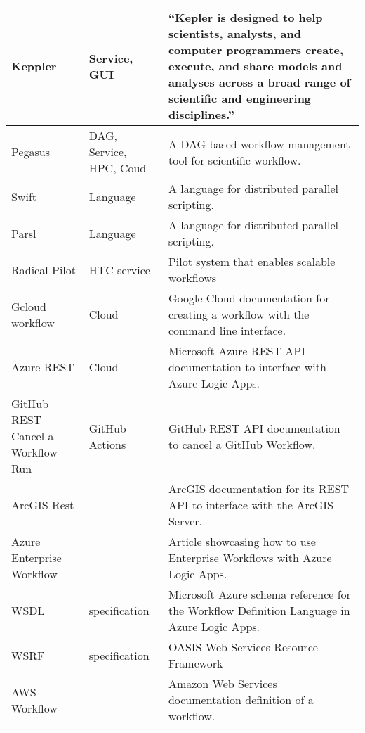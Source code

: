 \begin{table*}[htb]
{{\begin{tabular}{|p{3cm}|p{1.5cm}|p{10cm}|}
Keppler  \cite{www-kepler} & Service, GUI & ``Kepler is designed to help scientists, analysts, and computer programmers create, execute, and share models and analyses across a broad range of scientific and engineering disciplines.'' \\
\hline

Pegasus  \cite{www-pegasus} & DAG, Service, HPC, Coud&  A DAG based workflow management tool for scientific workflow.  \\
\hline

Swift \cite{las-2007-swift} & Language & A language for distributed parallel scripting.\\
\hline

Parsl \cite{www-parsl} & Language & A language for distributed parallel scripting. \\
\hline

Radical Pilot \cite{arxiv-radical-pilot} & HTC service & Pilot system that enables scalable workflows \\ 
\hline

Gcloud workflow \cite{www-gcloud} & Cloud & Google Cloud documentation for creating a workflow with the command line interface. \\
\hline

Azure REST \cite{www-azure-rest} & Cloud & Microsoft Azure REST API documentation to interface with Azure Logic Apps. \\
\hline

GitHub REST Cancel a Workflow Run \cite{www-github-rest-cancel}
& GitHub Actions
& GitHub REST API documentation to cancel a GitHub Workflow. \\
\hline

ArcGIS Rest \cite{www-arcgis-rest} & & ArcGIS documentation for its REST API to interface with the ArcGIS Server. \\
\hline

Azure Enterprise Workflow \cite{www-azure-enterprise-workflow} & & Article showcasing how to use Enterprise Workflows with Azure Logic Apps. \\
\hline

WSDL \cite{www-wsdl} & specification & Microsoft Azure schema reference for the Workflow Definition Language in Azure Logic Apps. \\
  \hline

  WSRF \cite{www-wsrf} & specification & OASIS Web Services Resource Framework\\

AWS Workflow \cite{www-aws-workflow} & & Amazon Web Services documentation definition of a workflow.\\
\hline


\end{tabular}}}
\end{table*}
